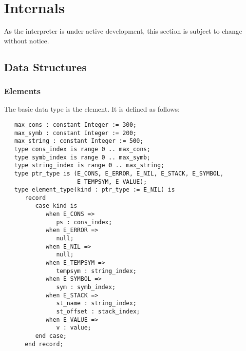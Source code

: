 \documentclass[10pt, openany]{book}
\begin{document}
\chapter{Internals}
As the interpreter is under active development, this section is subject to change without notice.

\section{Data Structures}

\subsection{Elements}
The basic data type is the element.  It is defined as follows:
\lstset{language=Ada}
\begin{lstlisting}
   max_cons : constant Integer := 300;
   max_symb : constant Integer := 200;
   max_string : constant Integer := 500;
   type cons_index is range 0 .. max_cons;
   type symb_index is range 0 .. max_symb;
   type string_index is range 0 .. max_string;
   type ptr_type is (E_CONS, E_ERROR, E_NIL, E_STACK, E_SYMBOL,
                     E_TEMPSYM, E_VALUE);
   type element_type(kind : ptr_type := E_NIL) is
      record
         case kind is
            when E_CONS =>
               ps : cons_index;
            when E_ERROR =>
               null;
            when E_NIL =>
               null;
            when E_TEMPSYM =>
               tempsym : string_index;
            when E_SYMBOL =>
               sym : symb_index;
            when E_STACK =>
               st_name : string_index;
               st_offset : stack_index;
            when E_VALUE =>
               v : value;
         end case;
      end record;
\end{lstlisting}
\end{document}
